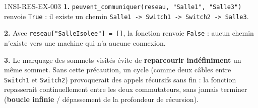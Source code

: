\begin{corrige}{1NSI-RES-EX-003}
\textbf{1.} \lstinline{peuvent_communiquer(reseau, "Salle1", "Salle3")} renvoie
\lstinline{True} : il existe un chemin \lstinline{Salle1 -> Switch1 -> Switch2 -> Salle3}.

\textbf{2.} Avec \lstinline{reseau["SalleIsolee"] = []}, la fonction renvoie
\lstinline{False} : aucun chemin n'existe vers une machine qui n'a aucune connexion.

\textbf{3.} Le marquage des sommets visités évite de \textbf{reparcourir indéfiniment} un
même sommet. Sans cette précaution, un cycle (comme deux câbles entre \lstinline{Switch1}
et \lstinline{Switch2}) provoquerait des appels récursifs sans fin : la fonction
repasserait continuellement entre les deux commutateurs, sans jamais terminer
(\textbf{boucle infinie} / dépassement de la profondeur de récursion).
\end{corrige}
